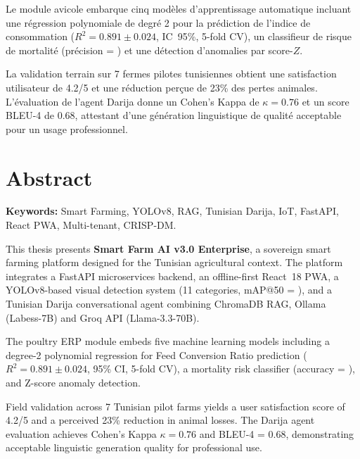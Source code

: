 Le module avicole embarque cinq modèles d'apprentissage automatique incluant
une régression polynomiale de degré 2 pour la prédiction de l'indice de
consommation ($R^2 = 0.891 \pm 0.024$, IC~95\%, 5-fold CV), un classifieur
de risque de mortalité (précision = ) et une détection
d'anomalies par score-$Z$.

La validation terrain sur 7 fermes pilotes tunisiennes obtient une satisfaction
utilisateur de 4.2/5 et une réduction perçue de 23\% des pertes animales.
L'évaluation de l'agent Darija donne un Cohen's Kappa de $\kappa = 0.76$
et un score BLEU-4 de 0.68, attestant d'une génération linguistique de
qualité acceptable pour un usage professionnel.

\chapter*{Abstract}
\begin{tcolorbox}[colback=gray!5,colframe=gray!50]
\textbf{Keywords:} Smart Farming, YOLOv8, RAG, Tunisian Darija,
IoT, FastAPI, React PWA, Multi-tenant, CRISP-DM.
\end{tcolorbox}

\medskip
This thesis presents \textbf{Smart Farm AI v3.0 Enterprise}, a sovereign
smart farming platform designed for the Tunisian agricultural context.
The platform integrates a FastAPI microservices backend, an offline-first
React~18 PWA, a YOLOv8-based visual detection system (11 categories,
mAP@50 = ), and a Tunisian Darija conversational
agent combining ChromaDB RAG, Ollama (Labess-7B) and Groq API (Llama-3.3-70B).

The poultry ERP module embeds five machine learning models including a
degree-2 polynomial regression for Feed Conversion Ratio prediction
($R^2 = 0.891 \pm 0.024$, 95\% CI, 5-fold CV), a mortality risk
classifier (accuracy = ), and Z-score anomaly detection.

Field validation across 7 Tunisian pilot farms yields a user satisfaction
score of 4.2/5 and a perceived 23\% reduction in animal losses.
The Darija agent evaluation achieves Cohen's Kappa $\kappa = 0.76$ and
BLEU-4 = 0.68, demonstrating acceptable linguistic generation quality
for professional use.

\setcounter{page}{1}
\tableofcontents
\listoffigures
\listoftables

